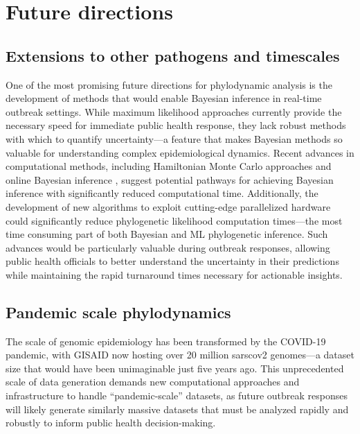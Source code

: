 \section{Future directions}
\subsection{Extensions to other pathogens and timescales}
One of the most promising future directions for phylodynamic analysis is the development of methods that would enable Bayesian inference in real-time outbreak settings.
While maximum likelihood approaches currently provide the necessary speed for immediate public health response, they lack robust methods with which to quantify uncertainty---a feature that makes Bayesian methods so valuable for understanding complex epidemiological dynamics.
Recent advances in computational methods, including Hamiltonian Monte Carlo approaches \citep{baele2020hamiltonian,ji2023scalable} and online Bayesian inference \citep{gill2020online,dinh2018online}, suggest potential pathways for achieving Bayesian inference with significantly reduced computational time.
Additionally, the development of new algorithms to exploit cutting-edge parallelized hardware \citep{suchard2009many-core,ayres2019beagle,gangavarapu2024many} could significantly reduce phylogenetic likelihood computation times---the most time consuming part of both Bayesian and ML phylogenetic inference.
Such advances would be particularly valuable during outbreak responses, allowing public health officials to better understand the uncertainty in their predictions while maintaining the rapid turnaround times necessary for actionable insights.

\subsection{Pandemic scale phylodynamics}
The scale of genomic epidemiology has been transformed by the COVID-19 pandemic, with GISAID now hosting over 20 million \gls{sarscov2} genomes---a dataset size that would have been unimaginable just five years ago.
This unprecedented scale of data generation demands new computational approaches and infrastructure to handle ``pandemic-scale'' datasets, as future outbreak responses will likely generate similarly massive datasets that must be analyzed rapidly and robustly to inform public health decision-making.

